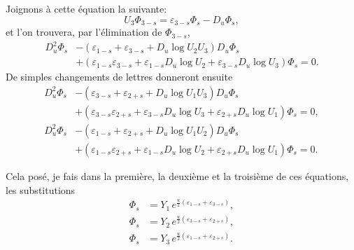 \documentclass[11pt,leqno,oneside,letterpaper]{book}[2005/09/16]
\begin{document}
Joignons \`a cette \'equation la suivante:
\[
U_3 \Phi_{3-s} = \varepsilon_{3-s} \Phi_s - D_u \Phi_s,
\]
et l'on trouvera, par l'\'elimination de $\Phi_{3-s}$,
\begin{align*}
D_u^2 \Phi_s &- (\varepsilon_{1-s} + \varepsilon_{3-s} + D_u \log U_2 U_3) D_u \Phi_s \\
             &+ (\varepsilon_{1-s}\varepsilon_{3-s} + \varepsilon_{1-s} D_u \log U_2 + \varepsilon_{3-s} D_u \log U_3 ) \Phi_s = 0.
\end{align*}
De simples changements de lettres donneront ensuite
\begin{align*}
D_u^2 \Phi_s &- (\varepsilon_{3-s} + \varepsilon_{2+s} + D_u \log U_1 U_3) D_u \Phi_s \\
             &+ (\varepsilon_{3-s}\varepsilon_{2+s} + \varepsilon_{3-s} D_u \log U_3 + \varepsilon_{2+s} D_u \log U_1) \Phi_s = 0, \\
D_u^2 \Phi_s &- (\varepsilon_{1-s} + \varepsilon_{2+s} + D_u \log U_1 U_2) D_u \Phi_s \\
             &+ (\varepsilon_{1-s}\varepsilon_{2+s} + \varepsilon_{1-s} D_u \log U_2 + \varepsilon_{2+s} D_u \log U_1) \Phi_s = 0.
\end{align*}

Cela pos\'e, je fais dans la premi\`ere, la deuxi\`eme et la troisi\`eme de
ces \'equations, les substitutions
\begin{align*}
\Phi_s &= Y_1\, e^{ \frac{u}{2} (\varepsilon_{1-s} + \varepsilon_{3-s})},\\
\Phi_s &= Y_2\, e^{ \frac{u}{2} (\varepsilon_{3-s} + \varepsilon_{2+s})},\\
\Phi_s &= Y_3\, e^{ \frac{u}{2} (\varepsilon_{1-s} + \varepsilon_{2+s})}.
\end{align*}
\end{document}

